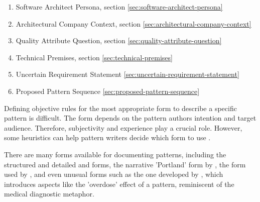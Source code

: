 



\begin{enumerate}
    \item Software Architect Persona, section \ref{sec:software-architect-persona}
    \item Architectural Company Context, section \ref{sec:architectural-company-context}
    \item Quality Attribute Question, section \ref{sec:quality-attribute-question}
    \item Technical Premises, section \ref{sec:technical-premises}
    \item Uncertain Requirement Statement \ref{sec:uncertain-requirement-statement}
    \item Proposed Pattern Sequence \ref{sec:proposed-pattern-sequence}
\end{enumerate}


Defining objective rules for the most appropriate form to describe a specific pattern is difficult. The form depends on the pattern authors intention and target audience. Therefore, subjectivity and experience play a crucial role. However, some heuristics can help pattern writers decide which form to use \cite{buschmann2007pattern}.

There are many forms available for documenting patterns, including the structured and detailed \textcite{Gamma1994} and  \textcite{buschmann1996pattern} forms, the narrative 'Portland' form by \textcite{cunningham1995checks}, the form used by \textcite{Alexander1977}, and even unusual forms such as the one developed by \textcite{cockburn1997surviving}, which introduces aspects like the 'overdose' effect of a pattern, reminiscent of the medical diagnostic metaphor.

